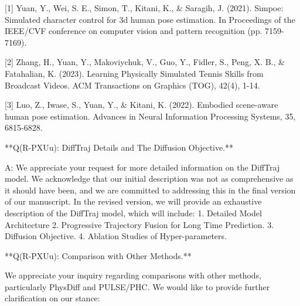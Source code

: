 [1] Yuan, Y., Wei, S. E., Simon, T., Kitani, K., & Saragih, J. (2021). Simpoe: Simulated character control for 3d human pose estimation. In Proceedings of the IEEE/CVF conference on computer vision and pattern recognition (pp. 7159-7169).

[2] Zhang, H., Yuan, Y., Makoviychuk, V., Guo, Y., Fidler, S., Peng, X. B., & Fatahalian, K. (2023). Learning Physically Simulated Tennis Skills from Broadcast Videos. ACM Transactions on Graphics (TOG), 42(4), 1-14.

[3] Luo, Z., Iwase, S., Yuan, Y., & Kitani, K. (2022). Embodied scene-aware human pose estimation. Advances in Neural Information Processing Systems, 35, 6815-6828.







**Q(R-PXUu): DiffTraj Details and The Diffusion Objective.**

A: We appreciate your request for more detailed information on the DiffTraj model. We acknowledge that our initial description was not as comprehensive as it should have been, and we are committed to addressing this in the final version of our manuscript. In the revised version, we will provide an exhaustive description of the DiffTraj model, which will include: 1. Detailed Model Architecture 2. Progressive Trajectory Fusion for Long Time Prediction. 3. Diffusion Objective. 4. Ablation Studies of Hyper-parameters.



**Q(R-PXUu): Comparison with Other Methods.**

We appreciate your inquiry regarding comparisons with other methods, particularly PhysDiff and PULSE/PHC. We would like to provide further clarification on our stance:

